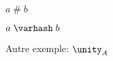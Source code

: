 \documentclass[varwidth, border = 3pt]{standalone}
\begin{document}
$a \mathrel{\#} b$

$a \mathrel{\varhash} b$

Autre exemple: $\unity_{A}$
\end{document}
